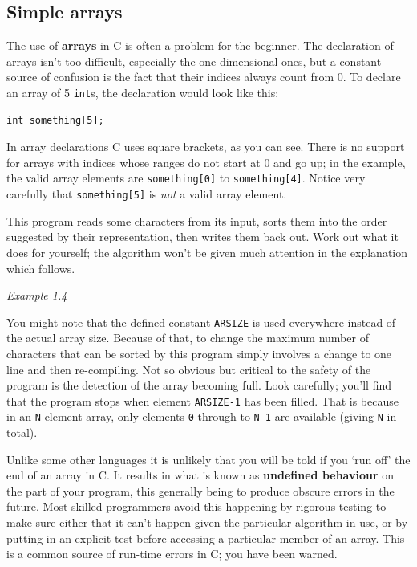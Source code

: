   

  \subsection{Simple arrays}
   

   The use of \textbf{arrays} in C is often a problem for the beginner.
    The declaration of arrays isn't too difficult, especially the
    one-dimensional ones, but a constant source of confusion is the fact
    that their indices always count from 0. To declare an array of
    5 \texttt{int}s, the declaration would look like this:


   \begin{Verbatim}
int something[5];
\end{Verbatim}

   In array declarations C uses square brackets, as you can see. There is
    no support for arrays with indices whose ranges do not start at 0 and go
    up; in the example, the valid array elements are \texttt{something[0]}
    to \texttt{something[4]}. Notice very carefully that
    \texttt{something[5]} is \textit{not} a valid array element.


   This program reads some characters from its input, sorts them into the
    order suggested by their representation, then writes them back out. Work
    out what it does for yourself; the algorithm won't be given much attention
    in the explanation which follows.


   \begin{center}\textit{Example 1.4}\end{center}


   You might note that the defined constant \texttt{ARSIZE} is used
    everywhere instead of the actual array size. Because of that, to change
    the maximum number of characters that can be sorted by this program simply
    involves a change to one line and then re-compiling. Not so obvious but
    critical to the safety of the program is the detection of the array
    becoming full. Look carefully; you'll find that the program stops when
    element \texttt{ARSIZE-1} has been filled. That is because in an
    \texttt{N} element array, only elements \texttt{0} through to
    \texttt{N-1} are available (giving \texttt{N} in total).


   Unlike some other languages it is unlikely that you will be told if you
    `run off' the end of an array in C. It results in what is known as
    \textbf{undefined behaviour} on the part of your program, this generally
    being to produce obscure errors in the future. Most skilled programmers
    avoid this happening by rigorous testing to make sure either that it can't
    happen given the particular algorithm in use, or by putting in an explicit
    test before accessing a particular member of an array. This is a common
    source of run-time errors in C; you have been warned.


